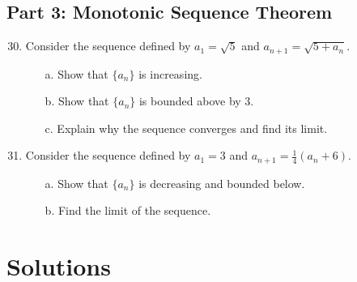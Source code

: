 \documentclass{article}
\begin{document}
\subsection*{Part 3: Monotonic Sequence Theorem}

\begin{enumerate}
    \setcounter{enumi}{29}
    \item Consider the sequence defined by $a_1 = \sqrt{5}$ and $a_{n+1} = \sqrt{5 + a_n}$.
    \begin{itemize}
        \item[a.] Show that $\{a_n\}$ is increasing.
        \item[b.] Show that $\{a_n\}$ is bounded above by 3.
        \item[c.] Explain why the sequence converges and find its limit.
    \end{itemize}

    \item Consider the sequence defined by $a_1 = 3$ and $a_{n+1} = \frac{1}{4}(a_n + 6)$.
    \begin{itemize}
        \item[a.] Show that $\{a_n\}$ is decreasing and bounded below.
        \item[b.] Find the limit of the sequence.
    \end{itemize}
\end{enumerate}


\newpage
\section*{Solutions}
\end{document}

